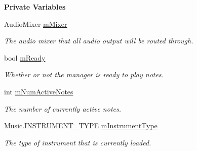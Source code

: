 \begin{Indent}\textbf{ Private Variables}\par
\begin{DoxyCompactItemize}
\item 
\mbox{\label{group___virtual_instrument_manager_a08c8db1bb89f4ab1e28451dd93d6b99c}} 
Audio\+Mixer \hyperlink{group___virtual_instrument_manager_a08c8db1bb89f4ab1e28451dd93d6b99c}{m\+Mixer}
\begin{DoxyCompactList}\small\item\em The audio mixer that all audio output will be routed through. \end{DoxyCompactList}\item 
\mbox{\label{group___virtual_instrument_manager_a983a11920bf16794735cc193c327ac42}} 
bool \hyperlink{group___virtual_instrument_manager_a983a11920bf16794735cc193c327ac42}{m\+Ready}
\begin{DoxyCompactList}\small\item\em Whether or not the manager is ready to play notes. \end{DoxyCompactList}\item 
\mbox{\label{group___virtual_instrument_manager_a0f7e11945763c48057be326b661dfdaf}} 
int \hyperlink{group___virtual_instrument_manager_a0f7e11945763c48057be326b661dfdaf}{m\+Num\+Active\+Notes}
\begin{DoxyCompactList}\small\item\em The number of currently active notes. \end{DoxyCompactList}\item 
\mbox{\label{group___virtual_instrument_manager_a108c350257b3a2080e06cd4a8251f6a4}} 
Music.\+I\+N\+S\+T\+R\+U\+M\+E\+N\+T\+\_\+\+T\+Y\+PE \hyperlink{group___virtual_instrument_manager_a108c350257b3a2080e06cd4a8251f6a4}{m\+Instrument\+Type}
\begin{DoxyCompactList}\small\item\em The type of instrument that is currently loaded. \end{DoxyCompactList}\item 
\mbox{\label{group___virtual_instrument_manager_a5e3a5116e0dabb37e0ea21d73ac1567e}} 

\end{DoxyCompactItemize}
\end{Indent}
